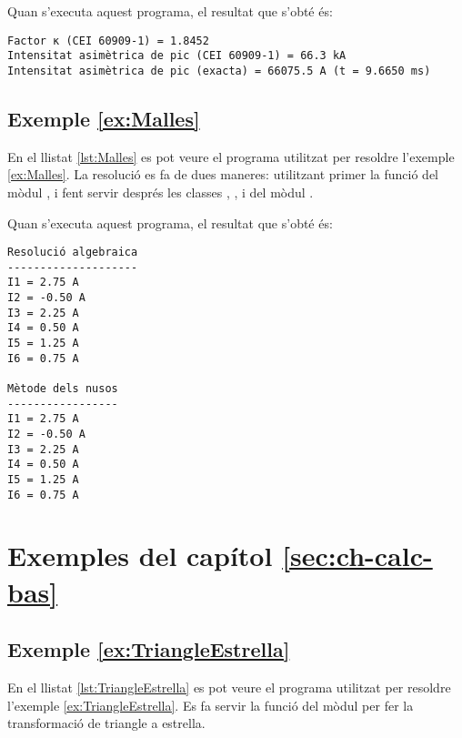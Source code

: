 Quan s'executa aquest programa, el resultat que s'obté és:
\lstset{
	language=,
	numbers=none,
	frame=none
}
\begin{lstlisting}
Factor κ (CEI 60909-1) = 1.8452
Intensitat asimètrica de pic (CEI 60909-1) = 66.3 kA
Intensitat asimètrica de pic (exacta) = 66075.5 A (t = 9.6650 ms)
\end{lstlisting}


\hypertarget{exemple:Malles}{\subsection{Exemple \ref*{ex:Malles} \Malles}}
En el llistat \vref{lst:Malles} es pot veure el programa utilitzat per resoldre l'exemple \vref{ex:Malles}. La resolució es fa de dues maneres: utilitzant primer la funció  del mòdul , i fent servir després les classes , , i  del mòdul .


Quan s'executa aquest programa, el resultat que s'obté és:
\lstset{
	language=,
	numbers=none,
	frame=none
}
\begin{lstlisting}
Resolució algebraica
--------------------
I1 = 2.75 A
I2 = -0.50 A
I3 = 2.25 A
I4 = 0.50 A
I5 = 1.25 A
I6 = 0.75 A

Mètode dels nusos
-----------------
I1 = 2.75 A
I2 = -0.50 A
I3 = 2.25 A
I4 = 0.50 A
I5 = 1.25 A
I6 = 0.75 A
\end{lstlisting} 



\section{Exemples del capítol \ref*{sec:ch-calc-bas}}

\hypertarget{exemple:TriangleEstrella}{\subsection{Exemple \ref*{ex:TriangleEstrella} \TriangleEstrella}}
En el llistat \vref{lst:TriangleEstrella} es pot veure el programa utilitzat per resoldre l'exemple \vref{ex:TriangleEstrella}. Es fa servir la funció  del mòdul  per fer la transformació de triangle a estrella.


